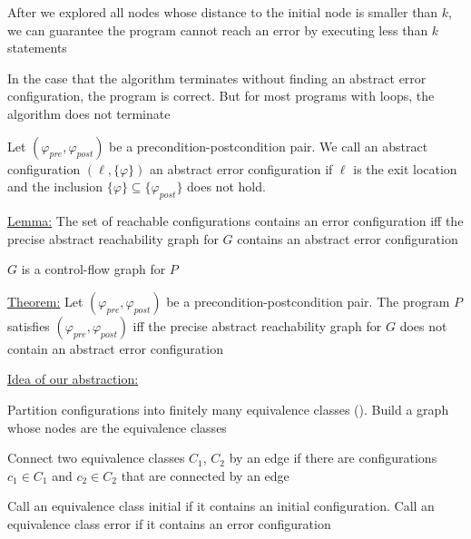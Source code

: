 \documentclass[landscape, a4paper]{article}
\begin{document}
\begin{minipage}[t]{0.2\linewidth}
\begin{betterlist}
\begin{betterlist}
			\begin{betterlist}
				\item After we explored all nodes whose distance to the initial node is smaller than $k$, we can guarantee the program cannot reach an error by executing less than $k$ statements
				\item In the case that the algorithm terminates without finding an abstract error configuration, the program is correct. But for most programs with loops, the algorithm does not terminate
			\end{betterlist}
		\end{betterlist}
		\item \color{orange}Let $(\varphi_{pre}, \varphi_{post})$ be a precondition-postcondition pair. We call an abstract configuration $(\ell, \{\varphi\})$ an \alert{abstract error configuration} if $\ell$ is the exit location and the inclusion $\{\varphi\} \subseteq \{\varphi_{post}\}$ does not hold. \color{black}
		\item \underline{Lemma:} The set of reachable configurations contains an error configuration \alert{iff} the precise abstract reachability graph for $G$ contains an abstract error configuration
		\begin{betterlist}
			\item $G$ is a control-flow graph for $P$
		\end{betterlist}
		\item \underline{Theorem:} Let $(\varphi_{pre}, \varphi_{post})$ be a precondition-postcondition pair. The program $P$ satisfies $(\varphi_{pre}, \varphi_{post})$ iff the precise abstract reachability graph for $G$ does not contain an abstract error configuration
	\end{betterlist}
	\begin{betterlist}
		\item \underline{Idea of our \alert{abstraction}:}
		\begin{betterlist}
			\item Partition configurations into finitely many equivalence classes (). Build a graph whose nodes are the equivalence classes
			\item Connect two equivalence classes $C_1$, $C_2$ by an edge if there are configurations $c_1 \in C_1$ and $c_2 \in C_2$ that are connected by an edge
			\item Call an equivalence class initial if it contains an initial configuration. Call an equivalence class error if it contains an error configuration

\end{betterlist}
\end{betterlist}
\end{minipage}
\end{document}
